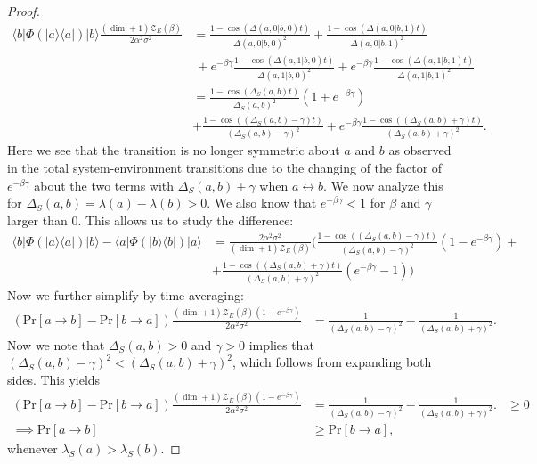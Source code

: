 \documentclass{article}
\newcommand{\ket}[1]{|#1\rangle}
\newcommand{\bra}[1]{\langle #1|}
\newcommand{\ketbra}[2]{| #1\rangle\! \langle #2|}
\newcommand{\prob}[1]{\text{Pr}\left[ #1 \right]}
\newcommand{\partfun}{\mathcal{Z}}
\begin{document}
\begin{proof}
\begin{align}
    \bra{b} \Phi(\ketbra{a}{a}) \ket{b} \frac{(\dim + 1) \partfun_E(\beta)}{2 \alpha^2 \sigma^2} &= \frac{1 - \cos ( \Delta(a, 0 | b, 0) t)}{\Delta(a, 0 | b, 0)^2} + \frac{1 - \cos ( \Delta(a, 0 | b, 1) t)}{\Delta(a, 0 | b, 1)^2} \nonumber \\
    &~ + e^{-\beta \gamma} \frac{1 - \cos ( \Delta(a, 1 | b, 0) t)}{\Delta(a, 1 | b, 0)^2} + e^{-\beta \gamma} \frac{1 - \cos ( \Delta(a, 1 | b, 1) t)}{\Delta(a, 1 | b, 1)^2} \\
    &= \frac{1 - \cos(\Delta_S(a,b)t)}{\Delta_S(a,b)^2}(1 + e^{-\beta \gamma}) \nonumber \\
    &+ \frac{1 - \cos((\Delta_S(a,b) - \gamma)t)}{(\Delta_S(a,b) - \gamma)^2} + e^{-\beta \gamma} \frac{1 - \cos((\Delta_S(a,b) + \gamma)t)}{(\Delta_S(a,b) + \gamma)^2} \label{eq:sys_transition_with_qubit_bath}.
\end{align}
Here we see that the transition is no longer symmetric about $a$ and $b$ as observed in the total system-environment transitions due to the changing of the factor of $e^{-\beta \gamma}$ about the two terms with $\Delta_S(a,b) \pm \gamma$ when $a \leftrightarrow b$. We now analyze this for $\Delta_S(a,b) = \lambda(a) - \lambda(b) > 0$. We also know that $e^{-\beta \gamma} < 1$ for $\beta$ and $\gamma$ larger than 0. This allows us to study the difference:
\begin{align}
    \bra{b} \Phi(\ketbra{a}{a}) \ket{b} - \bra{a} \Phi(\ketbra{b}{b}) \ket{a} &= \frac{2 \alpha^2 \sigma^2}{(\dim + 1) \partfun_E(\beta)} \bigg( \frac{1 - \cos((\Delta_S(a,b) - \gamma)t)}{(\Delta_S(a,b) - \gamma)^2}(1 - e^{-\beta \gamma}) +  \nonumber \\
    &+\frac{1 - \cos((\Delta_S(a,b) + \gamma)t)}{(\Delta_S(a,b) + \gamma)^2}(e^{-\beta \gamma} - 1) \bigg)
\end{align}
Now we further simplify by  time-averaging:
\begin{align}
    (\prob{a \to b} - \prob{b \to a}) \frac{(\dim + 1) \partfun_E(\beta) (1 - e^{-\beta \gamma})}{2 \alpha^2 \sigma^2} &= \frac{1}{(\Delta_S(a,b) - \gamma)^2} - \frac{1}{(\Delta_S(a,b) + \gamma)^2}.
\end{align}
Now we note that $\Delta_S(a,b) > 0$ and $\gamma > 0$ implies that $(\Delta_S(a,b) - \gamma)^2 < (\Delta_S(a,b) + \gamma)^2$, which follows from expanding both sides. This yields 
\begin{align}
(\prob{a \to b} - \prob{b \to a}) \frac{(\dim + 1) \partfun_E(\beta) (1 - e^{-\beta \gamma})}{2 \alpha^2 \sigma^2} &= \frac{1}{(\Delta_S(a,b) - \gamma)^2} - \frac{1}{(\Delta_S(a,b) + \gamma)^2}.
&\geq 0 \\
\implies \prob{a \to b} &\geq \prob{b \to a},
\end{align}
whenever $\lambda_S(a) > \lambda_S(b)$. 
\end{proof}
\end{document}

